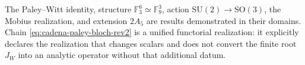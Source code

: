 \begin{statusbox}[title={Provenance and scope of the projective chain}]
The Paley--Witt identity, structure
\(\mathbb F_3^6\simeq\mathbb F_9^3\), action
\(\mathrm{SU}(2)\to\mathrm{SO}(3)\), the Mobius realization, and extension
\(2A_5\) are results demonstrated in their domains. Chain
\eqref{eq:cadena-paley-bloch-rev2} is a unified functorial realization:
it explicitly declares the realization that changes scalars and does not convert
the finite root \(J_W\) into an analytic operator without that additional datum.
\end{statusbox}

